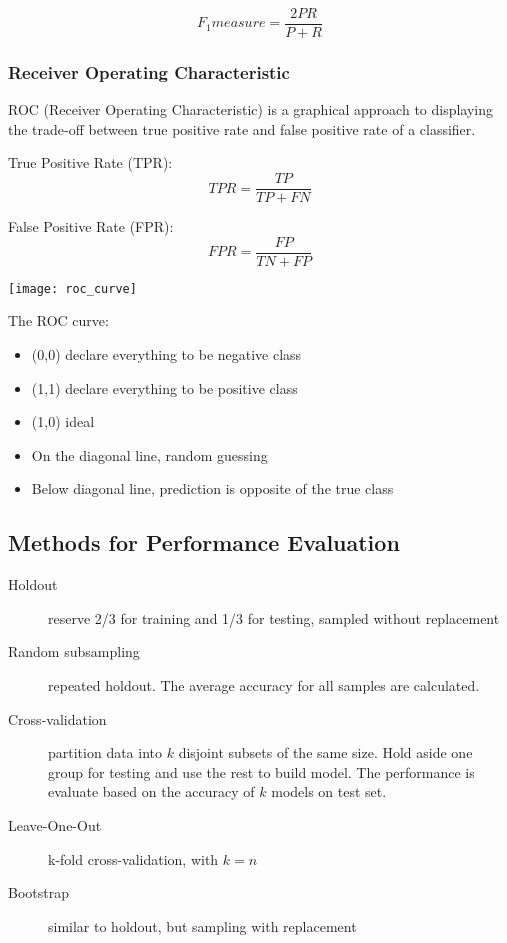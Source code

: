 \begin{multicols*}{2}
$$F_1measure=\frac{2PR}{P+R}$$

\subsubsection{Receiver Operating Characteristic}

\noindent ROC (Receiver Operating Characteristic) is a graphical approach to displaying the trade-off between true positive rate and false positive rate of a classifier.

\noindent True Positive Rate (TPR):
$$TPR = \frac{TP}{TP+FN}$$

\noindent False Positive Rate (FPR):
$$FPR = \frac{FP}{TN + FP}$$

\begin{center}
\texttt{[image: roc\_curve]}
\end{center}

\noindent The ROC curve:

\begin{itemize}
    \item (0,0) declare everything to be negative class
    \item (1,1) declare everything to be positive class
    \item (1,0) ideal
    \item On the diagonal line, random guessing
    \item Below diagonal line, prediction is opposite of the true class
\end{itemize}

\subsection{Methods for Performance Evaluation}

\begin{description}
    \item[Holdout] reserve 2/3 for training and 1/3 for testing, sampled without replacement
    \item[Random subsampling] repeated holdout. The average accuracy for all samples are calculated. 
    \item[Cross-validation] partition data into $k$ disjoint subsets of the same size. Hold aside one group for testing and use the rest to build model. The performance is evaluate based on the accuracy of $k$ models on test set. 
    \item[Leave-One-Out] k-fold cross-validation, with $k=n$
    \item[Bootstrap] similar to holdout, but sampling with replacement
\end{description}

\end{multicols*}
